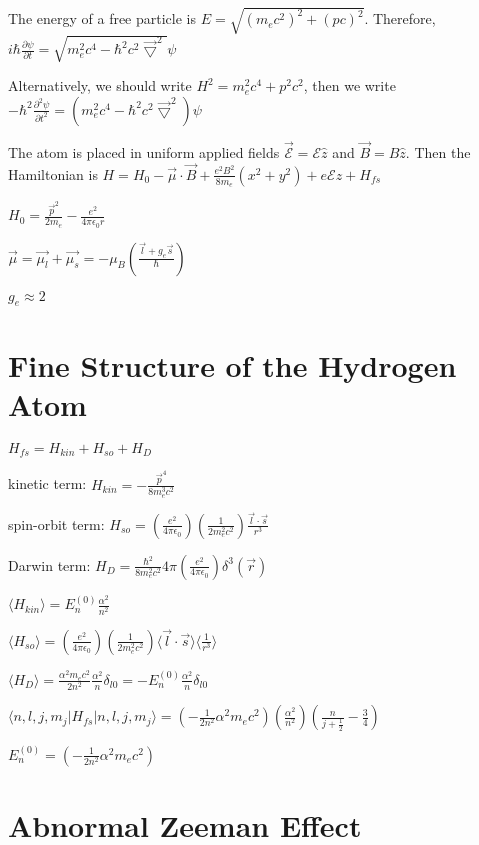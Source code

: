 \documentclass[12pt]{article}
\begin{document}
\begin{spacing}{2.0}
The energy of a free particle is $E=\sqrt{(m_e c^2)^2 + (pc)^2}$. Therefore, $i\hbar \frac{\partial \psi}{\partial t} = \sqrt{m_e^2 c^4 - \hbar^2 c^2 \vec{\bigtriangledown}^2} \psi$

Alternatively, we should write $H^2= m_e^2 c^4 + p^2 c^2$, then we write $-\hbar^2 \frac{\partial^2 \psi}{\partial t^2} = (m_e^2 c^4 - \hbar^2 c^2 \vec{\bigtriangledown}^2) \psi$

The atom is placed in uniform applied fields $\vec{\mathcal{E}}= \mathcal{E} \hat{z}$ and $\vec{B}= B \hat{z}$. Then the Hamiltonian is $H= H_0 - \vec{\mu} \cdot \vec{B} + \frac{e^2 B^2}{8m_e} \left( x^2 + y^2 \right) + e\mathcal{E} z + H_{fs}$

$H_0= \frac{\vec{p}^2}{2m_e} - \frac{e^2}{4\pi \epsilon_0 r}$

$\vec{\mu} = \vec{\mu_l} + \vec{\mu_s} = -\mu_B \left( \frac{\vec{l}+ g_e \vec{s}}{\hbar} \right)$

$g_e \approx 2$

\section{Fine Structure of the Hydrogen Atom}

$H_{fs}= H_{kin} + H_{so} + H_D$

kinetic term: $H_{kin}= -\frac{\vec{p}^4}{8m_e^3 c^2}$

spin-orbit term: $H_{so}= \left( \frac{e^2}{4\pi \epsilon_0} \right) \left( \frac{1}{2m_e^2 c^2} \right) \frac{\vec{l} \cdot \vec{s}}{r^3}$

Darwin term: $H_D= \frac{\hbar^2}{8m_e^2 c^2} 4\pi \left( \frac{e^2}{4\pi\epsilon_0} \right) \delta^3(\vec{r})$

$\langle H_{kin} \rangle = E_n^{(0)} \frac{\alpha^2}{n^2}$

$\langle H_{so} \rangle = \left( \frac{e^2}{4\pi\epsilon_0} \right) \left( \frac{1}{2m_e^2 c^2} \right) \langle \vec{l} \cdot \vec{s} \rangle \langle \frac{1}{r^3} \rangle $

$\langle H_{D} \rangle= \frac{\alpha^2 m_e c^2}{2n^2} \frac{\alpha^2}{n} \delta_{l0}= -E_n^{(0)} \frac{\alpha^2}{n} \delta_{l0}$

$\langle n,l,j,m_j|H_{fs}| n,l,j,m_j \rangle = \left( -\frac{1}{2n^2} \alpha^2 m_e c^2 \right) \left( \frac{\alpha^2}{n^2} \right) \left( \frac{n}{j+\frac{1}{2}}- \frac{3}{4} \right)$

$E_n^{(0)}= \left( -\frac{1}{2n^2} \alpha^2 m_e c^2 \right)$

\section{Abnormal Zeeman Effect}


\end{spacing}
\end{document}
